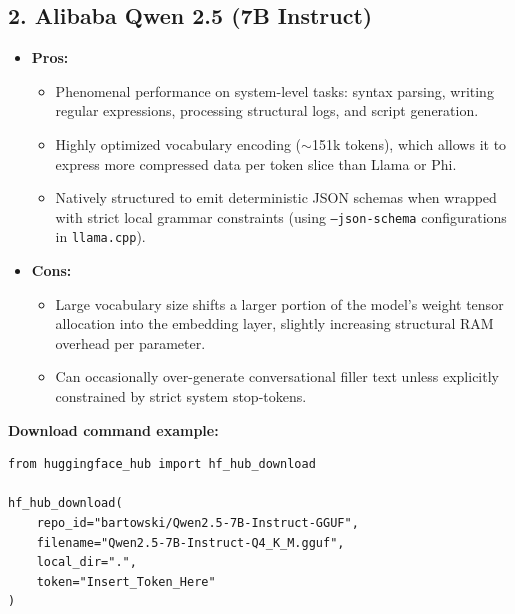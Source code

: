 \documentclass{article}
\begin{document}
\subsection*{2. Alibaba Qwen 2.5 (7B Instruct)}
\begin{itemize}
    \item \textbf{Pros:}
    \begin{itemize}
        \item Phenomenal performance on system-level tasks: syntax parsing, writing regular expressions, processing structural logs, and script generation.
        \item Highly optimized vocabulary encoding ($\sim$151k tokens), which allows it to express more compressed data per token slice than Llama or Phi.
        \item Natively structured to emit deterministic JSON schemas when wrapped with strict local grammar constraints (using \texttt{--json-schema} configurations in \texttt{llama.cpp}).
    \end{itemize}
    \item \textbf{Cons:}
    \begin{itemize}
        \item Large vocabulary size shifts a larger portion of the model's weight tensor allocation into the embedding layer, slightly increasing structural RAM overhead per parameter.
        \item Can occasionally over-generate conversational filler text unless explicitly constrained by strict system stop-tokens.
    \end{itemize}
\end{itemize}

\noindent\textbf{Download command example:}
\begin{verbatim}
from huggingface_hub import hf_hub_download

hf_hub_download(
    repo_id="bartowski/Qwen2.5-7B-Instruct-GGUF",
    filename="Qwen2.5-7B-Instruct-Q4_K_M.gguf",
    local_dir=".",
    token="Insert_Token_Here"
)
\end{verbatim}
\end{document}
